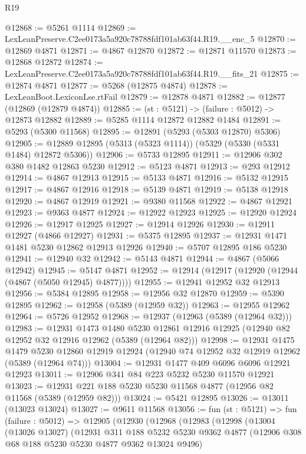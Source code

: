 \begin{lexlean}{R19}
\begin{coremodule}
@12868 := @5261 @1114
@12869 := LexLeanPreserve.C2ee0173a5a920c78788fdf101ab63f44.R19.__enc_5
@12870 := @12869 @4871
@12871 := @4867 @12870
@12872 := @12871 @11570
@12873 := @12868 @12872
@12874 := LexLeanPreserve.C2ee0173a5a920c78788fdf101ab63f44.R19.__fits_21
@12875 := @12874 @4871
@12877 := @5268 (@12875 @4874)
@12878 := LexLeanBoot.LexiconLse.rtFail
@12879 := @12878 @4871
@12882 := @12877 (@12869 (@12879 @4874))
@12885 := (st : @5121) -> (failure : @5012) -> @12873 @12882
@12889 := @5285 @1114 @12872 @12882 @1484
@12891 := @5293 (@5300 @11568)
@12895 := @12891 (@5293 (@5303 @12870) @5306)
@12905 := @12889 @12895 (@5313 (@5323 @1114)) (@5329 (@5330 (@5331 @1484) @12872 @5306))
@12906 := @5733 @12895
@12911 := @12906 @302 @380 @1482 @12863 @5230
@12912 := @5123 @4871
@12913 := @293 @12912
@12914 := @4867 @12913
@12915 := @5133 @4871
@12916 := @5132 @12915
@12917 := @4867 @12916
@12918 := @5139 @4871
@12919 := @5138 @12918
@12920 := @4867 @12919
@12921 := @9380 @11568
@12922 := @4867 @12921
@12923 := @9363 @4877
@12924 := @12922 @12923
@12925 := @12920 @12924
@12926 := @12917 @12925
@12927 := @12914 @12926
@12930 := @12911 @12927 (@4866 @12927)
@12931 := @5375 @12895
@12937 := @12931 @1471 @1481 @5230 @12862 @12913 @12926
@12940 := @5707 @12895 @186 @5230
@12941 := @12940 @32
@12942 := @5143 @4871
@12944 := @4867 (@5066 @12942)
@12945 := @5147 @4871
@12952 := @12914 (@12917 (@12920 (@12944 (@4867 (@5050 @12945) @4877))))
@12955 := @12941 @12952 @32 @12913
@12956 := @5384 @12895
@12958 := @12956 @32 @12870
@12959 := @5390 @12895
@12962 := @12958 (@5389 (@12959 @32))
@12963 := @12955 @12962
@12964 := @5726 @12952
@12968 := @12937 (@12963 (@5389 (@12964 @32)))
@12983 := @12931
    @1473
    @1480
    @5230
    @12861
    @12916
    @12925
    (@12940 @82 @12952 @32 @12916 @12962 (@5389 (@12964 @82)))
@12998 := @12931
    @1475
    @1479
    @5230
    @12860
    @12919
    @12924
    (@12940 @74 @12952 @32 @12919 @12962 (@5389 (@12964 @74)))
@13004 := @12931 @1477 @409 @6096 @6096 @12921 @12923
@13011 := @12906 @341 @84 @223 @5232 @5230 @11570 @12921
@13023 := @12931 @221 @188 @5230 @5230 @11568 @4877 (@12956 @82 @11568 (@5389 (@12959 @82)))
@13024 := @5421 @12895
@13026 := @13011 (@13023 @13024)
@13027 := @9611 @11568
@13056 := fun (st : @5121) =>
  fun (failure : @5012) =>
  @12905
    (@12930
      (@12968
        (@12983
          (@12998
            (@13004
              (@13026 @13027)
              (@12931
                @311
                @188
                @5232
                @5230
                @9362
                @4877
                (@12906 @308 @68 @188 @5230 @5230 @4877 @9362 @13024 @9496)

\end{coremodule}
\end{lexlean}
